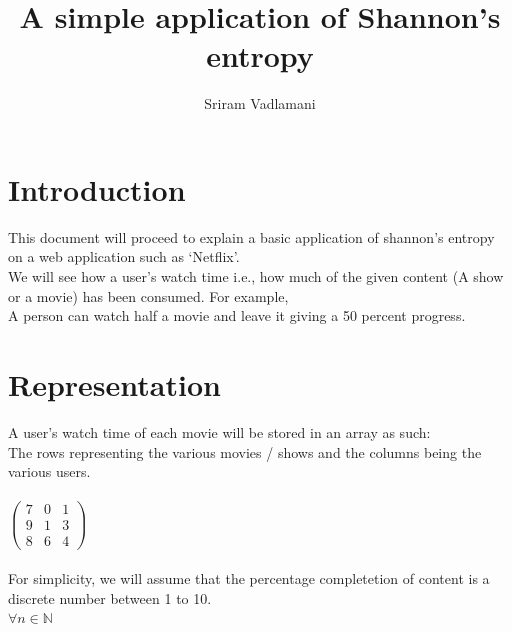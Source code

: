 \documentclass{article}
\title{A simple application of Shannon's entropy}
\author{Sriram Vadlamani}
\begin{document}
\maketitle
\newpage
\section{Introduction}
This document will proceed to explain a basic application of shannon's entropy on a web application such as `Netflix'.\\
We will see how a user's watch time i.e., how much of the given content (A show or a movie) has been consumed. For example,\\
A person can watch half a movie and leave it giving a 50 percent progress.\\

\section{Representation}
A user's watch time of each movie will be stored in an array as such:\\
The rows representing the various movies / shows and the columns being the various users.\\
\\
$\begin{pmatrix} 7 & 0 & 1\\ 9 & 1 & 3\\ 8 & 6 & 4 \end{pmatrix}$\\
\\
For simplicity, we will assume that the percentage completetion of content is a discrete number between 1 to 10.\\
$\forall n \in \mathbb{N}$\\
\\
\end{document}
